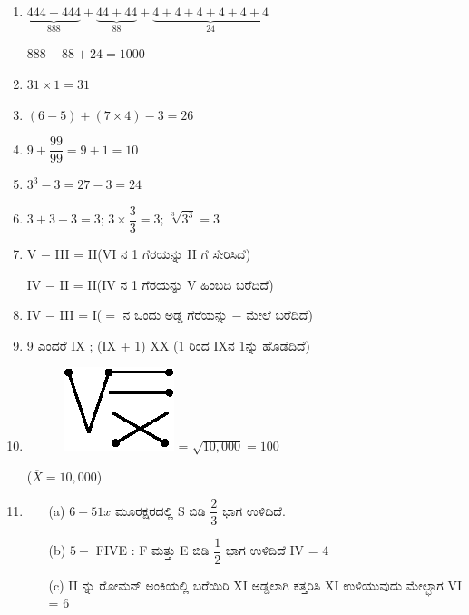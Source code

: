 \begin{enumerate}
\item $\underbrace{444 + 444}_{888} + \underbrace{44 + 44}_{88} + \underbrace{4 + 4 + 4 + 4 + 4 + 4}_{24}$

$888 + 88 + 24 = 1000$

\item $31 \times 1 = 31$

\item $(6- 5) + (7 \times 4) - 3 = 26$

\item $9 + \dfrac{99}{99} = 9 + 1 = 10$

\item $3^{3} - 3 = 27 - 3 = 24$

\item $3 + 3 - 3 = 3$; $3 \times \dfrac{3}{3} = 3$; $\sqrt[3]{3^{3}} = 3$

\item V $-$ III = II\quad (VI ನ 1 ಗೆರಯನ್ನು II ಗೆ ಸೇರಿಸಿದೆ)

IV $-$ II = II\quad (IV ನ 1 ಗೆರಯನ್ನು  V ಹಿಂಬದಿ ಬರೆದಿದೆ)

\item IV $-$ III = I\quad ($=$ ನ ಒಂದು ಅಡ್ಡ ಗೆರೆಯನ್ನು $-$ ಮೇಲೆ ಬರೆದಿದೆ)

\item 9 ಎಂದರೆ IX ; (IX + 1) XX (1 ರಿಂದ IXನ 1ನ್ನು ಹೊಡೆದಿದೆ)

\item 
\begin{figure}[H]
\centering
\includegraphics{images/chap4/ans10.eps}
 = $\sqrt{10,000} = 100$
\end{figure}

($\overline{X} = 10,000$)

\item 
\begin{itemize}
\item[(a)] $6 - 51x$ ಮೂರಕ್ಷರದಲ್ಲಿ S ಬಿಡಿ $\dfrac{2}{3}$ ಭಾಗ ಉಳಿದಿದೆ. 
\item[(b)] $5 -$ FIVE : F ಮತ್ತು E ಬಿಡಿ $\dfrac{1}{2}$ ಭಾಗ ಉಳಿದಿದೆ  IV = 4
\item[(c)] II ನ್ನು ರೋಮನ್ ಅಂಕಿಯಲ್ಲಿ ಬರೆಯಿರಿ XI ಅಡ್ಡಲಾಗಿ ಕತ್ತರಿಸಿ XI ಉಳಿಯುವುದು ಮೇಲ್ಭಾಗ VI = 6
\end{itemize}


\end{enumerate}

